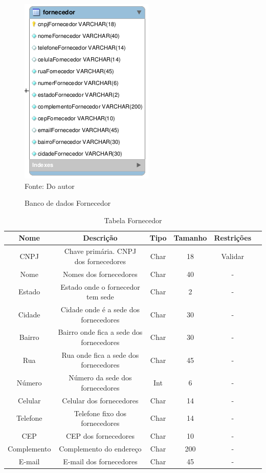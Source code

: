 
\begin{figure}[H]
	\centering 
	\caption{Banco de dados Fornecedor}
	\label{banco_de_dados}
	\includegraphics[scale = 0.8]{imagens/bd-fornecedor.png}
	\\Fonte: Do autor
\end{figure}

\begin{table}[H]
\caption{Tabela Fornecedor}
\begin{center}
\begin{tabular}{|c|c|c|c|c|c|}
\hline
Nome & Descrição & Tipo & Tamanho & Restrições \\ \hline
CNPJ & Chave primária. CNPJ dos fornecedores & Char & 18 & Validar \\ \hline
Nome & Nomes dos fornecedores & Char & 40 & - \\ \hline
Estado & Estado onde o fornecedor tem sede & Char & 2 & - \\ \hline
Cidade & Cidade onde é a sede dos fornecedores & Char & 30 & - \\ \hline
Bairro & Bairro onde fica a sede dos fornecedores & Char & 30 & - \\ \hline
Rua & Rua onde fica a sede dos fornecedores & Char & 45 & - \\ \hline
Número & Número da sede dos fornecedores & Int & 6 & - \\ \hline
Celular & Celular dos fornecedores & Char & 14 & - \\ \hline
Telefone & Telefone fixo dos fornecedores & Char & 14 & - \\ \hline
CEP & CEP dos fornecedores & Char & 10 & - \\ \hline
Complemento & Complemento do endereço & Char & 200 & - \\ \hline
E-mail & E-mail dos fornecedores & Char & 45 & - \\ \hline
\end{tabular}
\end{center}
\label{tabela_fornecedor}
\end{table}



